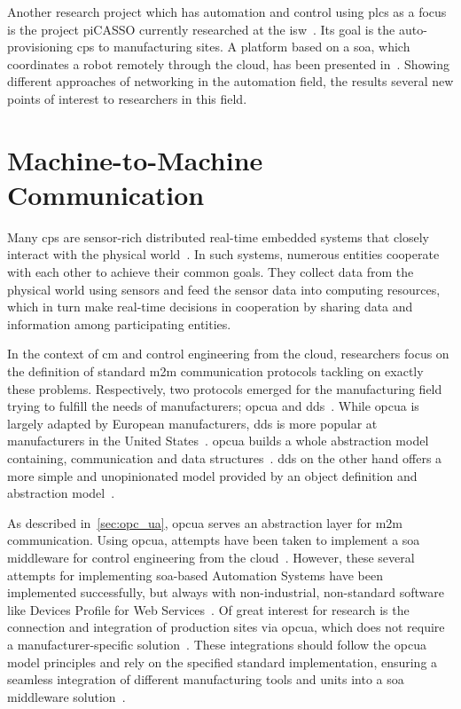 \documentclass[
a4paper,
twoside,
headsepline,
cleardoublepage=empty,
parskip=half,
draft=false
]{scrbook}
\begin{document}
			Another research project which has automation and control using \gls{plc}s as a focus is the project piCASSO currently researched at the \gls{isw}~\cite{kretschmer2016communication}.
			Its goal is the auto-provisioning \gls{cps} to manufacturing sites.
			A platform based on a \gls{soa}, which coordinates a robot remotely through the cloud, has been presented in~\cite{kretschmer2016communication}. 
			Showing different approaches of networking in the automation field, the results several new points of interest to researchers in this field.

		\section{Machine-to-Machine Communication}\label{sec:machine_to_machine_communication}
			
			Many \gls{cps} are sensor-rich distributed real-time embedded systems that closely interact with the physical world~\cite{kang2012rdds}. 
			In such systems, numerous entities cooperate with each other to achieve their common goals. 
			They collect data from the physical world using sensors and feed the sensor data into computing resources, which in turn make real-time decisions in cooperation by sharing data and information among participating entities.
			
			In the context of \gls{cm} and control engineering from the cloud, researchers focus on the definition of standard \gls{m2m} communication protocols tackling on exactly these problems.
			Respectively, two protocols emerged for the manufacturing field trying to fulfill the needs of manufacturers; \gls{opcua} and \gls{dds}~\cite{jazdi2014cyber}.
			While \gls{opcua} is largely adapted by European manufacturers, \gls{dds} is more popular at manufacturers in the United States~\cite{schleipen2008opc}.
			\gls{opcua} builds a whole abstraction model containing, communication and data structures~\cite{candido2010soa}.
			\gls{dds} on the other hand offers a more simple and unopinionated model provided by an object definition and abstraction model~\cite{candido2010soa}.
			
			As described in~\cref{sec:opc_ua}, \gls{opcua} serves an abstraction layer for \gls{m2m} communication. Using \gls{opcua}, attempts have been taken to implement a \gls{soa} middleware for control engineering from the cloud~\cite{melik2012towards}.
			However, these several attempts for implementing \gls{soa}-based Automation Systems have been implemented successfully, but always with non-industrial, non-standard software like Devices Profile for Web Services~\cite{melik2012towards}.
			Of great interest for research is the connection and integration of production sites via \gls{opcua}, which does not require a manufacturer-specific solution~\cite{melik2012towards}. These integrations should follow the \gls{opcua} model principles and rely on the specified standard implementation, ensuring a seamless integration of different manufacturing tools and units into a \gls{soa} middleware solution~\cite{imtiaz2013scalability}.
\end{document}
